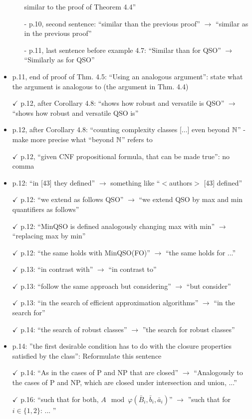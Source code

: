 \documentclass[a4paper]{article}
\begin{document}
\begin{itemize}
\begin{itemize}
		similar to the proof of Theorem 4.4''	
		\item[-] p.10, second sentence: ``similar than the previous proof'' $\to$ ``similar as in the previous
		proof''
		\item[-] p.11, last sentence before example 4.7: ``Similar than for QSO'' $\to$ ``Similarly as for QSO''
	\end{itemize}
	\item p.11, end of proof of Thm. 4.5: ``Using an analogous argument'': state what the argument is
	analogous to (the argument in Thm. 4.4)
	\item[$\checkmark$] p.12, after Corollary 4.8: ``shows how robust and versatile is QSO'' $\to$ ``shows how robust and
	versatile QSO is''
	\item p.12, after Corollary 4.8: ``counting complexity classes [...] even beyond $\mathbb{N}$'' - make more precise
	what ``beyond $\mathbb{N}$'' refers to
	\item[$\checkmark$] p.12, ``given CNF propositional formula, that can be made true'': no comma
	\item p.12: ``in [43] they defined'' $\to$ something like ``$<$authors$>$ [43] defined''
	\item[$\checkmark$] p.12: ``we extend as follows QSO'' $\to$ ``we extend QSO by max and min quantifiers as follows''
	\item[$\checkmark$] p.12: ``MinQSO is defined analogously changing max with min'' $\to$ ``replacing max by min''
	\item[$\checkmark$] p.12: ``the same holds with MinQSO(FO)'' $\to$ ``the same holds for ...''
	\item[$\checkmark$] p.13: ``in contrast with'' $\to$ ``in contrast to''
	\item[$\checkmark$] p.13: ``follow the same approach but considering'' $\to$ ``but consider''
	\item[$\checkmark$] p.13: ``in the search of efficient approximation algorithms'' $\to$ ``in the search for''
	\item[$\checkmark$] p.14: ``the search of robust classes'' $\to$ ''the search for robust classes''
	\item p.14: ''the first desirable condition has to do with the closure properties satisfied by the class'':
	Reformulate this sentence
	\item[$\checkmark$] p.14: ``As in the cases of P and NP that are closed'' $\to$ ``Analogously to the cases of P and
	NP, which are closed under intersection and union, ...''
	\item[$\checkmark$] p.16: ``such that for both, $A\mod\varphi(\bar{B}_i,\bar{b}_i,\bar{a}_i)$'' $\to$ ''such that for $i \in \{1,2\}$: ... ''

\end{itemize}
\end{document}
